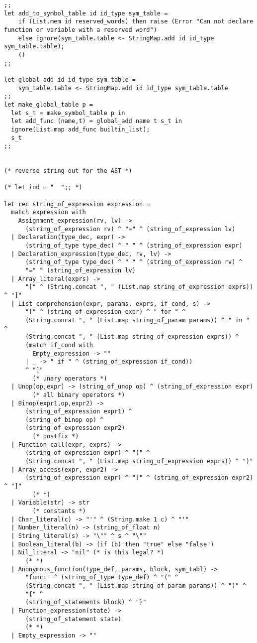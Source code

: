 \begin{verbatim}
;;
let add_to_symbol_table id id_type sym_table =
    if (List.mem id reserved_words) then raise (Error "Can not declare function or variable with a reserved word")
    else ignore(sym_table.table <- StringMap.add id id_type sym_table.table);
    ()
;;

let global_add id id_type sym_table =
    sym_table.table <- StringMap.add id id_type sym_table.table
;; 
let make_global_table p =
  let s_t = make_symbol_table p in
  let add_func (name,t) = global_add name t s_t in
  ignore(List.map add_func builtin_list);
  s_t
;;

    
(* reverse string out for the AST *)

(* let ind = "  ";; *)

let rec string_of_expression expression =
  match expression with
    Assignment_expression(rv, lv) ->
      (string_of_expression rv) ^ "=" ^ (string_of_expression lv)
  | Declaration(type_dec, expr) ->
      (string_of_type type_dec) ^ " " ^ (string_of_expression expr)
  | Declaration_expression(type_dec, rv, lv) ->
      (string_of_type type_dec) ^ " " ^ (string_of_expression rv) ^
      "=" ^ (string_of_expression lv)
  | Array_literal(exprs) ->
      "[" ^ (String.concat ", " (List.map string_of_expression exprs)) ^ "]"
  | List_comprehension(expr, params, exprs, if_cond, s) ->
      "[" ^ (string_of_expression expr) ^ " for " ^
      (String.concat ", " (List.map string_of_param params)) ^ " in " ^
      (String.concat ", " (List.map string_of_expression exprs)) ^
      (match if_cond with
        Empty_expression -> ""
      | _ -> " if " ^ (string_of_expression if_cond))
      ^ "]"
        (* unary operators *)
  | Unop(op,expr) -> (string_of_unop op) ^ (string_of_expression expr)
        (* all binary operators *)
  | Binop(expr1,op,expr2) ->
      (string_of_expression expr1) ^
      (string_of_binop op) ^
      (string_of_expression expr2)
        (* postfix *)
  | Function_call(expr, exprs) ->
      (string_of_expression expr) ^ "(" ^
      (String.concat ", " (List.map string_of_expression exprs)) ^ ")"
  | Array_access(expr, expr2) ->
      (string_of_expression expr) ^ "[" ^ (string_of_expression expr2) ^ "]"
        (* *)
  | Variable(str) -> str
        (* constants *)
  | Char_literal(c) -> "'" ^ (String.make 1 c) ^ "'"
  | Number_literal(n) -> (string_of_float n)
  | String_literal(s) -> "\"" ^ s ^ "\""
  | Boolean_literal(b) -> (if (b) then "true" else "false")
  | Nil_literal -> "nil" (* is this legal? *)
      (* *)
  | Anonymous_function(type_def, params, block, sym_tabl) ->
      "func:" ^ (string_of_type type_def) ^ "(" ^
      (String.concat ", " (List.map string_of_param params)) ^ ")" ^
      "{" ^
      (string_of_statements block) ^ "}"
  | Function_expression(state) ->
      (string_of_statement state)
      (* *)
  | Empty_expression -> ""


\end{verbatim}
